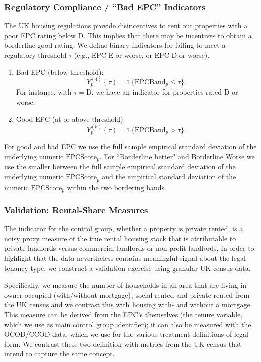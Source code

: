 \documentclass[12pt]{article}
\begin{document}
\subsubsection{Regulatory Compliance / ``Bad EPC'' Indicators}
The UK housing regulations provide disincentives to rent out properties with a poor EPC rating below D. This implies that there may be incentives to obtain a borderline good rating. We define binary indicators for failing to meet a regulatory threshold $\tau$ (e.g., EPC E or worse, or EPC D or worse).

\begin{enumerate}
    \item Bad EPC (below threshold):
    \[
    Y^{(4)}_p(\tau) = \mathbb{1}\{\text{EPCBand}_p \leq \tau\}.
    \]
    For instance, with $\tau = \text{D}$, we have an indicator for properties rated D or worse.

    \item Good EPC (at or above threshold):
    \[
    Y^{(5)}_p(\tau) = \mathbb{1}\{\text{EPCBand}_p > \tau\}.
    \]
\end{enumerate}

For good and bad EPC we use the full sample empirical standard deviation of the underlying numeric $\text{EPCScore}_p$. For ``Borderline better" and Borderline Worse we use the smaller between the full sample empirical standard deviation of the underlying numeric $\text{EPCScore}_p$ and the empirical standard deviation of the numeric $\text{EPCScore}_p$ within the two bordering bands.  


\subsubsection{Validation: Rental-Share Measures} \label{sec:validation-tenure} 
The indicator for the control group, whether a property is private rented, is a noisy proxy measure of the true rental housing stock that is attributable to private landlords versus commercial landlords or non-profit landlords. In order to highlight that the data nevertheless contains meaningful signal about the legal tenancy type, we construct a validation exercise using granular UK census data.

Specifically, we measure the number of households in an area that are living in owner occupied (with/without mortgage), social rented and private-rented from the UK census and we contrast this with  housing with- and without a mortgage. This measure can be derived from the EPC's themselves (the tenure variable, which we use as main control group identifier); it can also be measured with the OCOD/CCOD data, which we use for the various treatment definitions of legal form. We contrast these two definition with metrics from the UK census that intend to capture the same concept. 
\end{document}
